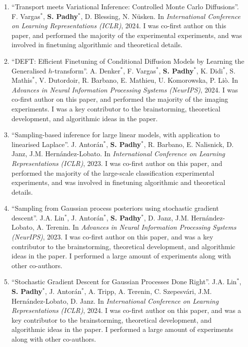 \begin{enumerate}
    \item ``Transport meets Variational Inference: Controlled Monte Carlo Diffusions''. F. Vargas$^{*}$, \textbf{S. Padhy}$^{*}$, D. Blessing, N. Nüsken. In \textit{International Conference on Learning Representations (ICLR)}, 2024. I was co-first author on this paper, and performed the majority of the experimental experiments, and was involved in finetuning algorithmic and theoretical details.
    \item ``DEFT: Efficient Finetuning of Conditional Diffusion Models by Learning the Generalised $ h $-transform''. A. Denker$^{*}$, F. Vargas$^{*}$, \textbf{S. Padhy}$^{*}$, K. Didi$^{*}$, S. Mathis$^{*}$, V. Dutordoir, R. Barbano, E. Mathieu, U. Komorowska, P. Liò. In \textit{Advances in Neural Information Processing Systems (NeurIPS)}, 2024. I was co-first author on this paper, and performed the majority of the imaging experiments. I was a key contributor to the brainstorming, theoretical development, and algorithmic ideas in the paper.
    \item ``Sampling-based inference for large linear models, with application to linearised Laplace''. J. Antorán$^{*}$, \textbf{S. Padhy}$^{*}$, R. Barbano, E. Nalisnick, D. Janz, J.M. Hernández-Lobato. In \textit{International Conference on Learning Representations (ICLR)}, 2023. I was co-first author on this paper, and performed the majority of the large-scale classification experimental experiments, and was involved in finetuning algorithmic and theoretical details.
    \item ``Sampling from Gaussian process posteriors using stochastic gradient descent''. J.A. Lin$^{*}$, J. Antorán$^{*}$, \textbf{S. Padhy}$^{*}$, D. Janz, J.M. Hernández-Lobato, A. Terenin. In \textit{Advances in Neural Information Processing Systems (NeurIPS)}, 2023. I was co-first author on this paper, and was a key contributor to the brainstorming, theoretical development, and algorithmic ideas in the paper. I performed a large amount of experiments along with other co-authors.
    \item ``Stochastic Gradient Descent for Gaussian Processes Done Right''. J.A. Lin$^{*}$, \textbf{S. Padhy}$^{*}$, J. Antorán$^{*}$, A. Tripp, A. Terenin, C. Szepesvári, J.M. Hernández-Lobato, D. Janz. In \textit{International Conference on Learning Representations (ICLR)}, 2024. I was co-first author on this paper, and was a key contributor to the brainstorming, theoretical development, and algorithmic ideas in the paper. I performed a large amount of experiments along with other co-authors.

\end{enumerate}
